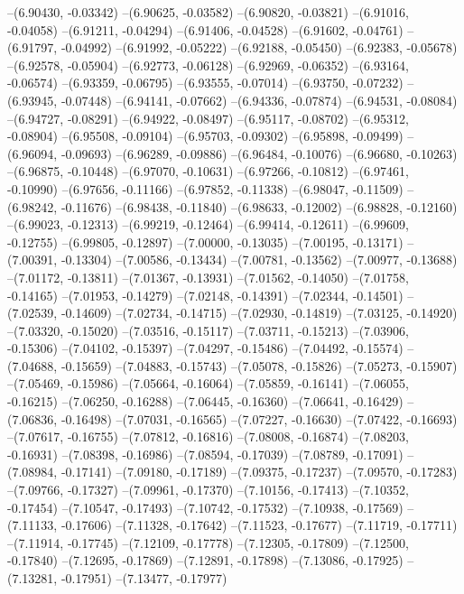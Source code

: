 --(6.90430, -0.03342)
--(6.90625, -0.03582)
--(6.90820, -0.03821)
--(6.91016, -0.04058)
--(6.91211, -0.04294)
--(6.91406, -0.04528)
--(6.91602, -0.04761)
--(6.91797, -0.04992)
--(6.91992, -0.05222)
--(6.92188, -0.05450)
--(6.92383, -0.05678)
--(6.92578, -0.05904)
--(6.92773, -0.06128)
--(6.92969, -0.06352)
--(6.93164, -0.06574)
--(6.93359, -0.06795)
--(6.93555, -0.07014)
--(6.93750, -0.07232)
--(6.93945, -0.07448)
--(6.94141, -0.07662)
--(6.94336, -0.07874)
--(6.94531, -0.08084)
--(6.94727, -0.08291)
--(6.94922, -0.08497)
--(6.95117, -0.08702)
--(6.95312, -0.08904)
--(6.95508, -0.09104)
--(6.95703, -0.09302)
--(6.95898, -0.09499)
--(6.96094, -0.09693)
--(6.96289, -0.09886)
--(6.96484, -0.10076)
--(6.96680, -0.10263)
--(6.96875, -0.10448)
--(6.97070, -0.10631)
--(6.97266, -0.10812)
--(6.97461, -0.10990)
--(6.97656, -0.11166)
--(6.97852, -0.11338)
--(6.98047, -0.11509)
--(6.98242, -0.11676)
--(6.98438, -0.11840)
--(6.98633, -0.12002)
--(6.98828, -0.12160)
--(6.99023, -0.12313)
--(6.99219, -0.12464)
--(6.99414, -0.12611)
--(6.99609, -0.12755)
--(6.99805, -0.12897)
--(7.00000, -0.13035)
--(7.00195, -0.13171)
--(7.00391, -0.13304)
--(7.00586, -0.13434)
--(7.00781, -0.13562)
--(7.00977, -0.13688)
--(7.01172, -0.13811)
--(7.01367, -0.13931)
--(7.01562, -0.14050)
--(7.01758, -0.14165)
--(7.01953, -0.14279)
--(7.02148, -0.14391)
--(7.02344, -0.14501)
--(7.02539, -0.14609)
--(7.02734, -0.14715)
--(7.02930, -0.14819)
--(7.03125, -0.14920)
--(7.03320, -0.15020)
--(7.03516, -0.15117)
--(7.03711, -0.15213)
--(7.03906, -0.15306)
--(7.04102, -0.15397)
--(7.04297, -0.15486)
--(7.04492, -0.15574)
--(7.04688, -0.15659)
--(7.04883, -0.15743)
--(7.05078, -0.15826)
--(7.05273, -0.15907)
--(7.05469, -0.15986)
--(7.05664, -0.16064)
--(7.05859, -0.16141)
--(7.06055, -0.16215)
--(7.06250, -0.16288)
--(7.06445, -0.16360)
--(7.06641, -0.16429)
--(7.06836, -0.16498)
--(7.07031, -0.16565)
--(7.07227, -0.16630)
--(7.07422, -0.16693)
--(7.07617, -0.16755)
--(7.07812, -0.16816)
--(7.08008, -0.16874)
--(7.08203, -0.16931)
--(7.08398, -0.16986)
--(7.08594, -0.17039)
--(7.08789, -0.17091)
--(7.08984, -0.17141)
--(7.09180, -0.17189)
--(7.09375, -0.17237)
--(7.09570, -0.17283)
--(7.09766, -0.17327)
--(7.09961, -0.17370)
--(7.10156, -0.17413)
--(7.10352, -0.17454)
--(7.10547, -0.17493)
--(7.10742, -0.17532)
--(7.10938, -0.17569)
--(7.11133, -0.17606)
--(7.11328, -0.17642)
--(7.11523, -0.17677)
--(7.11719, -0.17711)
--(7.11914, -0.17745)
--(7.12109, -0.17778)
--(7.12305, -0.17809)
--(7.12500, -0.17840)
--(7.12695, -0.17869)
--(7.12891, -0.17898)
--(7.13086, -0.17925)
--(7.13281, -0.17951)
--(7.13477, -0.17977)
